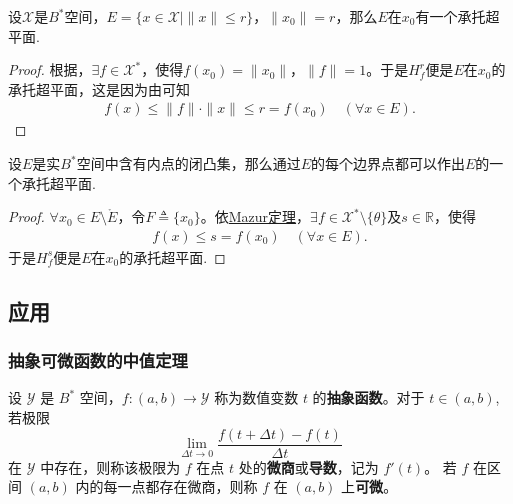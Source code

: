 \documentclass[../../main.tex]{subfiles}%
\begin{document}
\begin{example}
设$\mathscr{X}$是$B^*$空间，$E = \{ x \in \mathscr{X} \mid \|x\| \leqslant r \}$，$\|x_0\| = r$，那么$E$在$x_0$有一个承托超平面.
\end{example}
\begin{proof}

根据，$\exists f \in \mathscr{X}^*$，使得$f(x_0) = \|x_0\|$，$\|f\| = 1$。于是$H_f^r$便是$E$在$x_0$的承托超平面，这是因为由可知
\begin{align*}
f(x) \leqslant \|f\| \cdot \|x\| \leqslant r = f(x_0) \quad (\forall x \in E).
\end{align*}

\end{proof}

\begin{theorem}
设$E$是实$B^*$空间中含有内点的闭凸集，那么通过$E$的每个边界点都可以作出$E$的一个承托超平面.
\end{theorem}
\begin{proof}

$\forall x_0 \in E \setminus \mathring{E}$，令$F \triangleq \{x_0\}$。依\hyperref[corollary:泛函分析--Mazur定理]{Mazur定理}，$\exists f \in \mathscr{X}^* \setminus \{\theta\}$及$s \in \mathbb{R}$，使得
\begin{align*}
f(x) \leqslant s = f(x_0) \quad (\forall x \in E).
\end{align*}
于是$H_f^s$便是$E$在$x_0$的承托超平面.

\end{proof}

\subsection{应用}

\subsubsection{抽象可微函数的中值定理}

\begin{definition}[抽象函数的微商]
设 $\mathscr{Y}$ 是 $B^*$ 空间，$f: (a,b) \to \mathscr{Y}$ 称为数值变数 $t$ 的\textbf{抽象函数}。对于 $t \in (a,b)$,若极限
\[
\lim_{\Delta t \to 0} \frac{f(t + \Delta t) - f(t)}{\Delta t}
\]
在 $\mathscr{Y}$ 中存在，则称该极限为 $f$ 在点 $t$ 处的\textbf{微商}或\textbf{导数}，记为 $f'(t)$。
若 $f$ 在区间 $(a,b)$ 内的每一点都存在微商，则称 $f$ 在 $(a,b)$ 上\textbf{可微}。
\end{definition}
\end{document}
